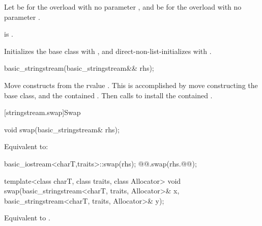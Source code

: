 \begin{itemdescr}
\pnum
Let  be 
for the overload with no parameter , and
 be  for the overload with no parameter .

\pnum
\constraints
{}
is .

\pnum
\effects
Initializes the base class with , and
direct-non-list-initializes  with .
\end{itemdescr}

%
\begin{itemdecl}
basic_stringstream(basic_stringstream&& rhs);
\end{itemdecl}

\begin{itemdescr}
\pnum
\effects
Move constructs from the rvalue . This
is accomplished by move constructing the base class, and the contained
.
Then calls 
to install the contained .
\end{itemdescr}

[stringstream.swap]{Swap}

%
\begin{itemdecl}
void swap(basic_stringstream& rhs);
\end{itemdecl}

\begin{itemdescr}
\pnum
\effects
Equivalent to:
\begin{codeblock}
basic_iostream<charT,traits>::swap(rhs);
@@.swap(rhs.@@);
\end{codeblock}
\end{itemdescr}

%
\begin{itemdecl}
template<class charT, class traits, class Allocator>
  void swap(basic_stringstream<charT, traits, Allocator>& x,
            basic_stringstream<charT, traits, Allocator>& y);
\end{itemdecl}

\begin{itemdescr}
\pnum
\effects
Equivalent to .
\end{itemdescr}

